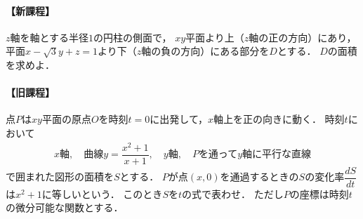 \documentclass[../../main.tex]{subfiles}
\begin{document}
\paragraph{【新課程】}
$z$軸を軸とする半径$1$の円柱の側面で，
$xy$平面より上（$z$軸の正の方向）にあり，
平面$x-\sqrt{3}y+z=1$より下（$z$軸の負の方向）にある部分を$D$とする．
$D$の面積を求めよ．

\paragraph{【旧課程】}
点$P$は$xy$平面の原点$O$を時刻$t=0$に出発して，$x$軸上を正の向きに動く．
時刻$t$において
\begin{align}
  x\text{軸}, \quad \text{曲線}y=\dfrac{x^2+1}{x+1}, \quad y\text{軸}, \quad P\text{を通って}y\text{軸に平行な直線}
\end{align}
で囲まれた図形の面積を$S$とする．
$P$が点$(x,0)$を通過するときの$S$の変化率$\dfrac{dS}{dt}$は$x^2+1$に等しいという．
このとき$S$を$t$の式で表わせ．
ただし$P$の座標は時刻$t$の微分可能な関数とする．
\end{document}
